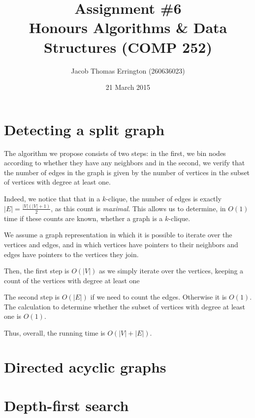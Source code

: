 \documentclass{article}
\title{Assignment \#6\\Honours Algorithms & Data Structures (COMP 252)}
\author{Jacob Thomas Errington (260636023)}
\date{21 March 2015}
\begin{document}
\maketitle

\section{Detecting a split graph}

The algorithm we propose consists of two steps: in the first, we bin nodes according to whether they have any neighbors and in the second, we verify that the number of edges in the graph is given by the number of vertices in the subset of vertices with degree at least one.

Indeed, we notice that that in a $k$-clique, the number of edges is exactly $|E| = \frac{|V|(|V| + 1)}{2}$, as this count is \emph{maximal}. This allows us to determine, in $O(1)$ time if these counts are known, whether a graph is a $k$-clique.

We assume a graph representation in which it is possible to iterate over the vertices and edges, and in which vertices have pointers to their neighbors and edges have pointers to the vertices they join.

Then, the first step is $O(|V|)$ as we simply iterate over the vertices, keeping a count of the vertices with degree at least one

The second step is $O(|E|)$ if we need to count the edges. Otherwise it is $O(1)$. The calculation to determine whether the subset of vertices with degree at least one is $O(1)$.

Thus, overall, the running time is $O(|V| + |E|)$.

\section{Directed acyclic graphs}





\section{Depth-first search}
\end{document}
